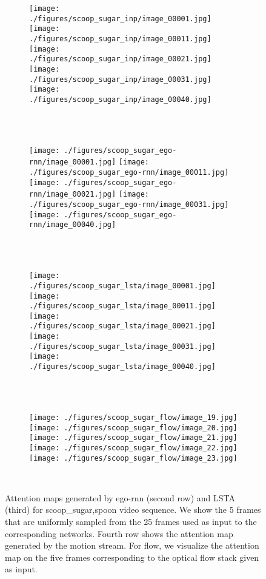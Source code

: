 \documentclass[10pt,twocolumn,letterpaper]{article}
\begin{document}
\begin{matrix*}[r]
\begin{figure*}[t]
	\centering      
	\begin{subfigure}[b]{0.95\textwidth}
		\texttt{[image: ./figures/scoop\_sugar\_inp/image\_00001.jpg]}
		\texttt{[image: ./figures/scoop\_sugar\_inp/image\_00011.jpg]}
		\texttt{[image: ./figures/scoop\_sugar\_inp/image\_00021.jpg]}
		\texttt{[image: ./figures/scoop\_sugar\_inp/image\_00031.jpg]}
		\texttt{[image: ./figures/scoop\_sugar\_inp/image\_00040.jpg]}
	\end{subfigure}\\ \vskip 2mm
	\ 
	\begin{subfigure}[b]{0.95\textwidth}
		\texttt{[image: ./figures/scoop\_sugar\_ego-rnn/image\_00001.jpg]}
		\texttt{[image: ./figures/scoop\_sugar\_ego-rnn/image\_00011.jpg]}
		\texttt{[image: ./figures/scoop\_sugar\_ego-rnn/image\_00021.jpg]}
		\texttt{[image: ./figures/scoop\_sugar\_ego-rnn/image\_00031.jpg]}
		\texttt{[image: ./figures/scoop\_sugar\_ego-rnn/image\_00040.jpg]}
	\end{subfigure}\\ \vskip 2mm
	\ 
	\begin{subfigure}[b]{0.95\textwidth}
		\texttt{[image: ./figures/scoop\_sugar\_lsta/image\_00001.jpg]}
		\texttt{[image: ./figures/scoop\_sugar\_lsta/image\_00011.jpg]}
		\texttt{[image: ./figures/scoop\_sugar\_lsta/image\_00021.jpg]}
		\texttt{[image: ./figures/scoop\_sugar\_lsta/image\_00031.jpg]}
		\texttt{[image: ./figures/scoop\_sugar\_lsta/image\_00040.jpg]}
	\end{subfigure}\\ \vskip 2mm	       
	\ 
	\begin{subfigure}[b]{0.95\textwidth}
		\texttt{[image: ./figures/scoop\_sugar\_flow/image\_19.jpg]}
		\texttt{[image: ./figures/scoop\_sugar\_flow/image\_20.jpg]}
		\texttt{[image: ./figures/scoop\_sugar\_flow/image\_21.jpg]}
		\texttt{[image: ./figures/scoop\_sugar\_flow/image\_22.jpg]}
		\texttt{[image: ./figures/scoop\_sugar\_flow/image\_23.jpg]}
	\end{subfigure}\\ \vskip 2mm			 
	\caption{Attention maps generated by ego-rnn (second row) and LSTA (third) for scoop\_sugar,spoon video sequence. We show the 5 frames that are uniformly sampled from the 25 frames used as input to the corresponding networks. Fourth row shows the attention map generated by the motion stream. For flow, we visualize the attention map on the five frames corresponding to the optical flow stack given as input.}
	\label{fig:att_map_scoop_sugar}
\end{figure*}
	

\end{matrix*}
\end{document}

